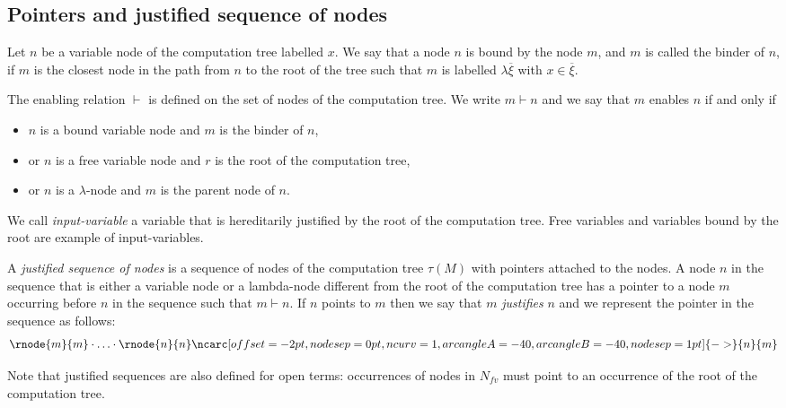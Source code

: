 \documentclass{llncs}
\newcommand{\bkptr}[2][nodesep=0pt]{\ncarc[offset=-2pt,nodesep=0pt,ncurv=1,arcangleA=-#2, arcangleB=-#2,#1]{->}}
\begin{document}
\subsection{Pointers and justified sequence of nodes}

\begin{definition}[Binder]
Let $n$ be a variable node of the computation tree labelled $x$. We
say that a node $n$ is bound by the node $m$, and $m$ is called the
binder of $n$, if $m$ is the closest node in the path from $n$ to
the root of the tree such that $m$ is labelled $\lambda
\overline{\xi}$ with $x\in \overline{\xi}$.
\end{definition}

\begin{definition}[Enabling]
The enabling relation $\vdash$ is defined on the set of nodes of the
computation tree. We write $m \vdash n$ and we say that $m$ enables
$n$ if and only if
\begin{itemize}
\item $n$ is a bound variable node and $m$ is the binder of $n$,
\item or $n$ is a free variable node and $r$ is the root of the computation tree,
\item or $n$ is a $\lambda$-node and $m$ is the parent node of $n$.
\end{itemize}
\end{definition}

We call \emph{input-variable} a variable that is hereditarily justified by the root of the computation tree.
Free variables and variables bound by the root are example of input-variables.

\begin{definition}
A \emph{justified sequence of nodes} is a sequence of
nodes of the computation tree $\tau(M)$ with pointers attached to the nodes. A node $n$ in the sequence
that is either a variable node or a lambda-node different from the root of the computation tree
has a pointer to a node $m$ occurring before $n$ in the sequence such that $m \vdash n$.
If $n$ points to $m$ then we say that $m$ \emph{justifies} $n$ and we represent the pointer in the sequence as follows:
$$\rnode{m}{m} \cdot \ldots \cdot \rnode{n}{n} \bkptr[nodesep=1pt]{40}{n}{m}$$
\end{definition}
Note that justified sequences are also defined for open terms:
occurrences of nodes in $N_{fv}$ must point to an occurrence of the
root of the computation tree.
\end{document}
